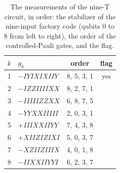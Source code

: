 \documentclass[aps,prl,reprint,twocolumn,amsmath,amssymb,floatfix,nofootinbib,superscriptaddress]{revtex4-2}
\theoremstyle{definition}
\theoremstyle{remark}
\begin{document}
\begin{table}[h]
\caption{The measurements of the nine-T circuit, in order: the stabilizer of the nine-input factory code (qubits $0$ to $8$ from left to right), the order of the controlled-Pauli gates, and the flag.}
\label{tab:t9}
\begin{ruledtabular}
\begin{tabular}{clcc}
$k$ & $g_k$ & order & flag\\
\hline
1 & $-IYIXIXIIY$ & 8, 5, 3, 1 & yes\\
2 & $-IZZIIIIXX$ & 8, 2, 7, 1 & \\
3 & $-IIIIIZZXX$ & 6, 8, 7, 5 & \\
4 & $-YYXXIIIII$ & 2, 0, 3, 1 & \\
5 & $+IIIXXIIYY$ & 7, 4, 3, 8 & \\
6 & $+XIIZIZIXI$ & 5, 0, 3, 7 & \\
7 & $-XZIIZIIIX$ & 4, 0, 1, 8 & \\
8 & $-IIXXIIYYI$ & 6, 2, 3, 7 & \\
\end{tabular}
\end{ruledtabular}
\end{table}
\end{document}
